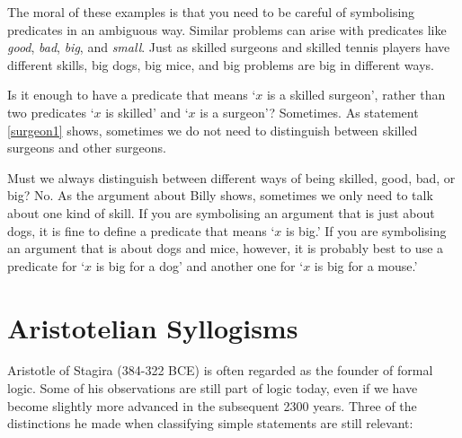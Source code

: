 \documentclass[PHIL101-Textbook.tex]{subfiles}
\begin{document}
The moral of these examples is that you need to be careful of symbolising predicates in an ambiguous way. Similar problems can arise with predicates like \emph{good}, \emph{bad}, \emph{big}, and \emph{small}. Just as skilled surgeons and skilled tennis players have different skills, big dogs, big mice, and big problems are big in different ways.

Is it enough to have a predicate that means `$x$ is a skilled surgeon', rather than two predicates `$x$ is skilled' and `$x$ is a surgeon'? Sometimes. As statement \ref{surgeon1} shows, sometimes we do not need to distinguish between skilled surgeons and other surgeons.

Must we always distinguish between different ways of being skilled, good, bad, or big? No. As the argument about Billy shows, sometimes we only need to talk about one kind of skill. If you are symbolising an argument that is just about dogs, it is fine to define a predicate that means `$x$ is big.' If you are symbolising an argument that is about dogs and mice, however, it is probably best to use a predicate for `$x$ is big for a dog' and another one for `$x$ is big for a mouse.'



\pagebreak
\section{Aristotelian Syllogisms}

Aristotle of Stagira (384-322 BCE) is often regarded as the founder of formal logic. Some of his observations are still part of logic today, even if we have become slightly more advanced in the subsequent 2300 years. Three of the distinctions he made when classifying simple statements are still relevant:
\end{document}

